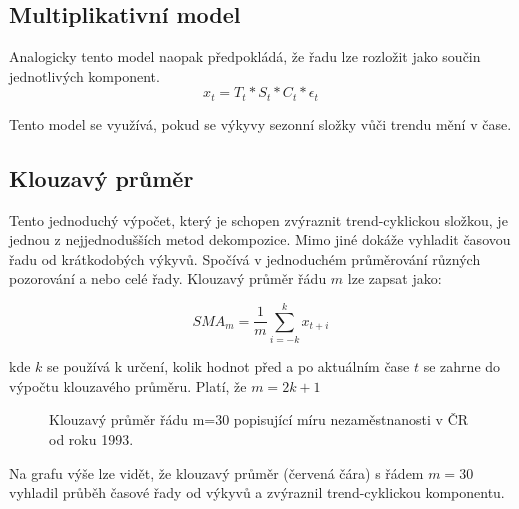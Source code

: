 \documentclass[FM,BP,fonts]{tulthesis}
\begin{document}
\subsection{Multiplikativní model}
Analogicky tento model naopak předpokládá, že řadu lze rozložit jako součin jednotlivých komponent.
\begin{equation}
	x_t = T_t * S_t * C_t * \epsilon_t
\end{equation}

Tento model se využívá, pokud se výkyvy sezonní složky vůči trendu mění v čase.

 
\subsection{Klouzavý průměr}
Tento jednoduchý výpočet, který je schopen zvýraznit trend-cyklickou složkou, je jednou z nejjednodušších metod dekompozice. Mimo jiné dokáže vyhladit časovou řadu od krátkodobých výkyvů. Spočívá v jednoduchém průměrování různých pozorování a nebo celé řady.  Klouzavý průměr řádu $m$ lze zapsat jako:
 
\begin{equation}
SMA_m = \frac{1}{m} \sum_{i=-k}^{k}x_{t+i}
\end{equation}
 
kde $k$ se používá k určení, kolik hodnot před a po aktuálním čase $t$ se zahrne do výpočtu klouzavého průměru. Platí, že $m = 2k+1$

\begin{figure}[htbp]
	\centering
	\caption{Klouzavý průměr řádu m=30 popisující míru nezaměstnanosti v ČR od roku 1993. }
	\label{fig:my_graph}
\end{figure}

Na grafu výše lze vidět, že klouzavý průměr (červená čára) s řádem $m=30$ vyhladil průběh časové řady od výkyvů a zvýraznil trend-cyklickou komponentu.
\end{document}
